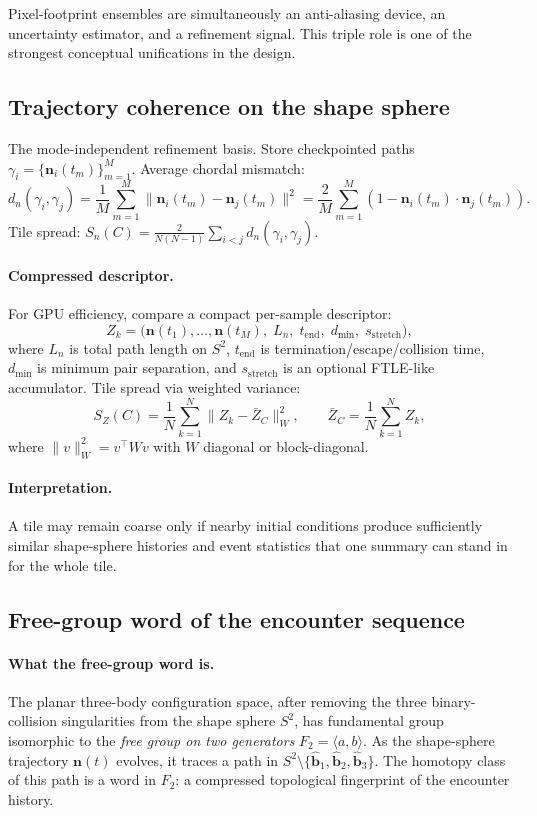 \documentclass[11pt]{report}
\begin{document}
Pixel-footprint ensembles are simultaneously an anti-aliasing device, an uncertainty estimator, and a refinement signal. This triple role is one of the strongest conceptual unifications in the design.

\subsection{Trajectory coherence on the shape sphere}
\label{sec:trajectory_coherence}

The mode-independent refinement basis. Store checkpointed paths $\gamma_i=\{\mathbf n_i(t_m)\}_{m=1}^M$. Average chordal mismatch:
\[
d_n(\gamma_i,\gamma_j) = \frac{1}{M}\sum_{m=1}^M \|\mathbf n_i(t_m)-\mathbf n_j(t_m)\|^2 = \frac{2}{M}\sum_{m=1}^M(1-\mathbf n_i(t_m)\cdot\mathbf n_j(t_m)).
\]
Tile spread: $S_n(C) = \frac{2}{N(N-1)}\sum_{i<j}d_n(\gamma_i,\gamma_j)$.

\paragraph{Compressed descriptor.} For GPU efficiency, compare a compact per-sample descriptor:
\[
Z_k = \big(\mathbf n(t_1),\ldots,\mathbf n(t_M),\;L_n,\;t_{\mathrm{end}},\;d_{\min},\;s_{\mathrm{stretch}}\big),
\]
where $L_n$ is total path length on $S^2$, $t_{\mathrm{end}}$ is termination/escape/collision time, $d_{\min}$ is minimum pair separation, and $s_{\mathrm{stretch}}$ is an optional FTLE-like accumulator. Tile spread via weighted variance:
\[
S_Z(C)=\frac{1}{N}\sum_{k=1}^N\|Z_k-\bar Z_C\|_W^2,\qquad \bar Z_C=\frac{1}{N}\sum_{k=1}^N Z_k,
\]
where $\|v\|_W^2=v^\top W v$ with $W$ diagonal or block-diagonal.

\paragraph{Interpretation.} A tile may remain coarse only if nearby initial conditions produce sufficiently similar shape-sphere histories and event statistics that one summary can stand in for the whole tile.

\subsection{Free-group word of the encounter sequence}
\label{sec:free_group}

\paragraph{What the free-group word is.} The planar three-body configuration space, after removing the three binary-collision singularities from the shape sphere $S^2$, has fundamental group isomorphic to the \emph{free group on two generators} $F_2=\langle a,b\rangle$. As the shape-sphere trajectory $\mathbf n(t)$ evolves, it traces a path in $S^2\setminus\{\hat{\mathbf b}_1,\hat{\mathbf b}_2,\hat{\mathbf b}_3\}$. The homotopy class of this path is a word in $F_2$: a compressed topological fingerprint of the encounter history.
\end{document}
